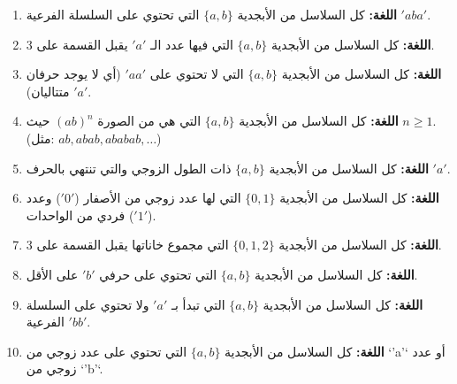 \documentclass[12pt]{article}
\begin{document}
\begin{enumerate}
\item %
\textbf{اللغة:} كل السلاسل من الأبجدية $\{a, b\}$ التي تحتوي على السلسلة الفرعية $'aba'$.

\item
\textbf{اللغة:} كل السلاسل من الأبجدية $\{a, b\}$ التي فيها عدد الـ $'a'$ يقبل القسمة على 3.

\item
\textbf{اللغة:} كل السلاسل من الأبجدية $\{a, b\}$ التي لا تحتوي على $'aa'$ (أي لا يوجد حرفان $'a'$ متتاليان).

\item
\textbf{اللغة:} كل السلاسل من الأبجدية $\{a, b\}$ التي هي من الصورة $(ab)^n$ حيث $n \ge 1$. \\
(مثل: $ab, abab, ababab, \dots$)

\item
\textbf{اللغة:} كل السلاسل من الأبجدية $\{a, b\}$ ذات الطول الزوجي والتي تنتهي بالحرف $'a'$.

\item
\textbf{اللغة:} كل السلاسل من الأبجدية $\{0, 1\}$ التي لها عدد زوجي من الأصفار ($'0'$) وعدد فردي من الواحدات ($'1'$).

\item
\textbf{اللغة:} كل السلاسل من الأبجدية $\{0, 1, 2\}$ التي مجموع خاناتها يقبل القسمة على 3.

\item
\textbf{اللغة:} كل السلاسل من الأبجدية $\{a, b\}$ التي تحتوي على حرفي $'b'$ على الأقل.

\item
\textbf{اللغة:} كل السلاسل من الأبجدية $\{a, b\}$ التي تبدأ بـ $'a'$ ولا تحتوي على السلسلة الفرعية $'bb'$.

\item
\textbf{اللغة:} كل السلاسل من الأبجدية $\{a, b\}$ التي تحتوي على عدد زوجي من `'a'` أو عدد زوجي من `'b'`.

\end{enumerate}
\end{document}
